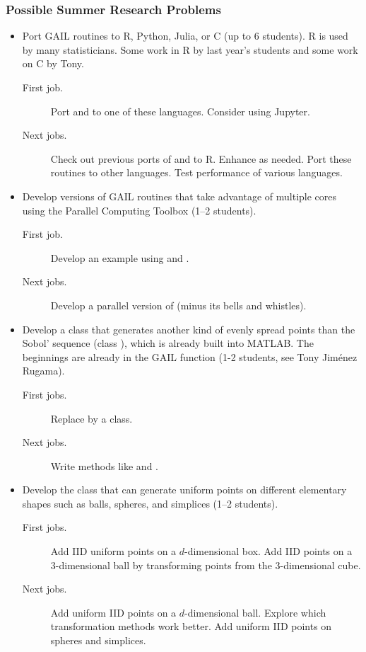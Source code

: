 \documentclass[10pt,compress,xcolor={usenames,dvipsnames}]{beamer} %
\begin{document}
\begin{frame}[allowframebreaks]
\frametitle{Possible Summer Research Problems}

\begin{itemize}
\item Port GAIL routines to R, Python, Julia, or C (up to 6 students).  R is used by many statisticians.  Some work in R by last year's students and some work on C by Tony.
\begin{description}
\item[First job.] Port  and  to one of these languages.  Consider using Jupyter.
\item[Next jobs.] Check out previous ports of  and  to R.  Enhance as needed.
\newline Port these routines to other languages.
\newline Test performance of various languages.
\end{description}

\item Develop versions of GAIL routines that take advantage of multiple cores using the Parallel Computing Toolbox (1--2 students).  
\begin{description}
\item[First job.] Develop an example using  and .
\item[Next jobs.] Develop a parallel version of  (minus its bells and whistles).
\end{description}

\pagebreak

\item Develop a class  that generates another kind of evenly spread points than the Sobol' sequence (class ), which is already built into MATLAB. The beginnings are already in the GAIL function  (1-2 students, see Tony Jim\'enez Rugama).
\begin{description}
\item[First jobs.] Replace  by a class.
\item[Next jobs.] Write methods like  and .
\end{description}


\item Develop the class  that can generate uniform points on different elementary shapes such as balls, spheres, and simplices (1--2 students). 
\begin{description}
\item[First jobs.] Add IID uniform points on a $d$-dimensional box.  \newline Add IID points on a 3-dimensional ball by transforming points from the 3-dimensional cube.
\item[Next jobs.] Add uniform IID points on a $d$-dimensional ball. \newline Explore which transformation methods work better. \newline
Add uniform IID points on spheres and simplices.
\end{description}


\end{itemize}
\end{frame}
\end{document}
